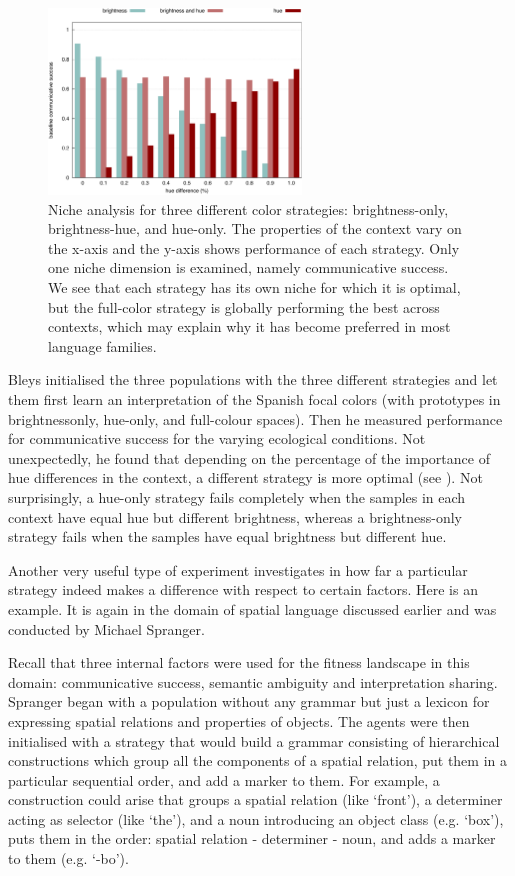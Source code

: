 \begin{figure}[htb!]
\centerline{
\includegraphics[width=0.6\textwidth]{chap12/figs/selective-advantage-bar.pdf}
}
\caption{{Niche analysis for three different 
color strategies: brightness-only, brightness-hue, and hue-only. 
The properties of the context vary on the x-axis and the y-axis shows performance of each strategy.
Only one niche dimension is examined, namely communicative success. 
We see that each strategy has its own niche for which it is optimal, but the full-color strategy is globally 
performing the best across contexts, which may explain why it has become preferred in most language families. 
\label{fig:bar}}
} 
\end{figure} 

Bleys initialised the three populations with the three different strategies and let them first learn an interpretation of 
the Spanish focal colors (with prototypes in brightness\-only, hue-only, and full-colour spaces). Then he measured 
performance for communicative success for the varying ecological conditions. 
Not unexpectedly, he found that depending on the percentage of the importance of hue differences in the context, a different strategy 
is more optimal (see ). Not surprisingly, a hue-only strategy fails completely when the samples in each  
context have equal hue but different brightness, whereas a brightness-only strategy fails when the samples have 
equal brightness but different hue.

Another very useful type of experiment investigates in how far a particular strategy indeed makes a difference 
with respect to certain factors. Here is an example. It is again in the domain of spatial language discussed earlier and 
was conducted by Michael Spranger.

Recall that three internal factors were used 
for the fitness landscape in this domain: communicative success, semantic ambiguity and interpretation sharing. Spranger began with 
a population without any grammar but just a lexicon for expressing spatial relations and properties of objects. 
The agents were then initialised with a strategy that would build a grammar consisting of hierarchical
constructions which group all the components of a spatial relation, put them in a particular sequential order,
and add a marker to them. For example, a construction could arise that groups a spatial relation (like `front'), 
a determiner acting as selector (like `the'), and a noun introducing an object class (e.g. `box'), puts them 
in the order: spatial relation - determiner - noun, and adds a marker to them (e.g. `-bo'). 


